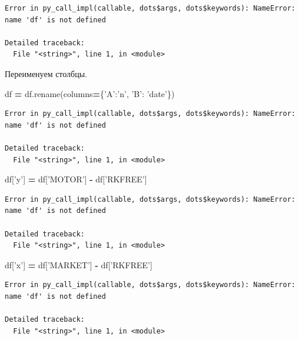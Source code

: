 \documentclass[]{book}
\newenvironment{Shaded}{\begin{snugshade}}{\end{snugshade}}
\newcommand{\NormalTok}[1]{#1}
\newcommand{\OperatorTok}[1]{\textcolor[rgb]{0.81,0.36,0.00}{\textbf{#1}}}
\newcommand{\StringTok}[1]{\textcolor[rgb]{0.31,0.60,0.02}{#1}}
\begin{document}
\begin{verbatim}
Error in py_call_impl(callable, dots$args, dots$keywords): NameError: name 'df' is not defined

Detailed traceback: 
  File "<string>", line 1, in <module>
\end{verbatim}

Переименуем столбцы.

\begin{Shaded}
\begin{Highlighting}[]
\NormalTok{df }\OperatorTok{=}\NormalTok{ df.rename(columns}\OperatorTok{=}\NormalTok{\{}\StringTok{'A'}\NormalTok{:}\StringTok{'n'}\NormalTok{, }\StringTok{'B'}\NormalTok{: }\StringTok{'date'}\NormalTok{\})}
\end{Highlighting}
\end{Shaded}

\begin{verbatim}
Error in py_call_impl(callable, dots$args, dots$keywords): NameError: name 'df' is not defined

Detailed traceback: 
  File "<string>", line 1, in <module>
\end{verbatim}

\begin{Shaded}
\begin{Highlighting}[]
\NormalTok{df[}\StringTok{'y'}\NormalTok{] }\OperatorTok{=}\NormalTok{ df[}\StringTok{'MOTOR'}\NormalTok{] }\OperatorTok{-}\NormalTok{ df[}\StringTok{'RKFREE'}\NormalTok{]}
\end{Highlighting}
\end{Shaded}

\begin{verbatim}
Error in py_call_impl(callable, dots$args, dots$keywords): NameError: name 'df' is not defined

Detailed traceback: 
  File "<string>", line 1, in <module>
\end{verbatim}

\begin{Shaded}
\begin{Highlighting}[]
\NormalTok{df[}\StringTok{'x'}\NormalTok{] }\OperatorTok{=}\NormalTok{ df[}\StringTok{'MARKET'}\NormalTok{] }\OperatorTok{-}\NormalTok{ df[}\StringTok{'RKFREE'}\NormalTok{] }
\end{Highlighting}
\end{Shaded}

\begin{verbatim}
Error in py_call_impl(callable, dots$args, dots$keywords): NameError: name 'df' is not defined

Detailed traceback: 
  File "<string>", line 1, in <module>
\end{verbatim}
\end{document}
